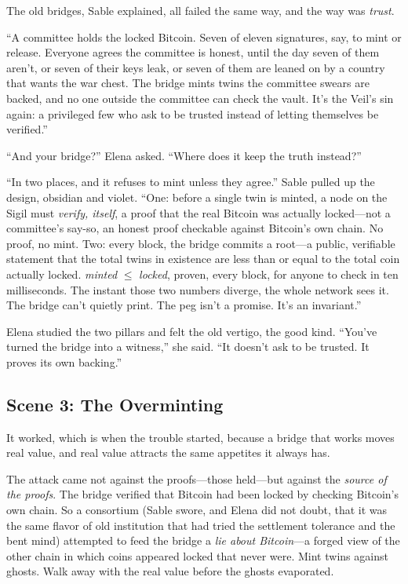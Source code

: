 The old bridges, Sable explained, all failed the same way, and the way was
\emph{trust}.

``A committee holds the locked Bitcoin. Seven of eleven signatures, say, to mint
or release. Everyone agrees the committee is honest, until the day seven of them
aren't, or seven of their keys leak, or seven of them are leaned on by a country
that wants the war chest. The bridge mints twins the committee swears are backed,
and no one outside the committee can check the vault. It's the Veil's sin again:
a privileged few who ask to be trusted instead of letting themselves be
verified.''

``And your bridge?'' Elena asked. ``Where does it keep the truth instead?''

``In two places, and it refuses to mint unless they agree.'' Sable pulled up the
design, obsidian and violet. ``One: before a single twin is minted, a node on the
Sigil must \emph{verify, itself}, a proof that the real Bitcoin was actually
locked---not a committee's say-so, an honest proof checkable against Bitcoin's own
chain. No proof, no mint. Two: every block, the bridge commits a root---a public,
verifiable statement that the total twins in existence are less than or equal to
the total coin actually locked. \emph{minted} $\leq$ \emph{locked}, proven, every
block, for anyone to check in ten milliseconds. The instant those two numbers
diverge, the whole network sees it. The bridge can't quietly print. The peg isn't
a promise. It's an invariant.''

Elena studied the two pillars and felt the old vertigo, the good kind. ``You've
turned the bridge into a witness,'' she said. ``It doesn't ask to be trusted. It
proves its own backing.''

\hypertarget{scene-3-the-overminting}{%
\subsection{Scene 3: The
Overminting}\label{scene-3-the-overminting}}

It worked, which is when the trouble started, because a bridge that works moves
real value, and real value attracts the same appetites it always has.

The attack came not against the proofs---those held---but against the \emph{source
of the proofs}. The bridge verified that Bitcoin had been locked by checking
Bitcoin's own chain. So a consortium (Sable swore, and Elena did not doubt, that it
was the same flavor of old institution that had tried the settlement tolerance and
the bent mind) attempted to feed the bridge a \emph{lie about Bitcoin}---a forged
view of the other chain in which coins appeared locked that never were. Mint twins
against ghosts. Walk away with the real value before the ghosts evaporated.

